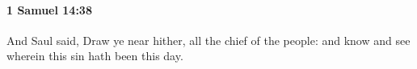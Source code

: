 
		\paragraph{1 Samuel 14:38} %
			\label{1SAMUEL-14-38}

			And Saul said, Draw ye near hither, all the chief of the people: and know and see wherein this sin hath been this day.


